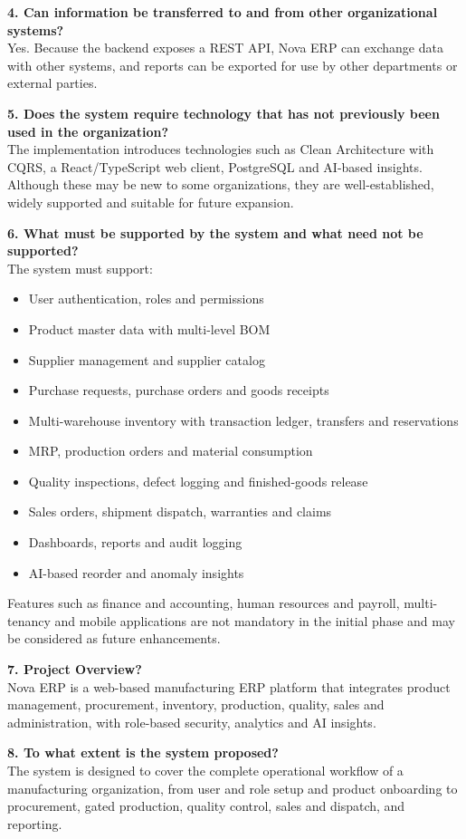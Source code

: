 \documentclass[12pt,a4paper]{report}
\begin{document}
\textbf{4. Can information be transferred to and from other organizational systems?}\\
Yes. Because the backend exposes a REST API, Nova ERP can exchange data with other systems, and reports can be exported for use by other departments or external parties.

\textbf{5. Does the system require technology that has not previously been used in the organization?}\\
The implementation introduces technologies such as Clean Architecture with CQRS, a React/TypeScript web client, PostgreSQL and AI-based insights. Although these may be new to some organizations, they are well-established, widely supported and suitable for future expansion.

\textbf{6. What must be supported by the system and what need not be supported?}\\
The system must support:
\begin{itemize}
\item User authentication, roles and permissions
\item Product master data with multi-level BOM
\item Supplier management and supplier catalog
\item Purchase requests, purchase orders and goods receipts
\item Multi-warehouse inventory with transaction ledger, transfers and reservations
\item MRP, production orders and material consumption
\item Quality inspections, defect logging and finished-goods release
\item Sales orders, shipment dispatch, warranties and claims
\item Dashboards, reports and audit logging
\item AI-based reorder and anomaly insights
\end{itemize}
Features such as finance and accounting, human resources and payroll, multi-tenancy and mobile applications are not mandatory in the initial phase and may be considered as future enhancements.

\textbf{7. Project Overview?}\\
Nova ERP is a web-based manufacturing ERP platform that integrates product management, procurement, inventory, production, quality, sales and administration, with role-based security, analytics and AI insights.

\textbf{8. To what extent is the system proposed?}\\
The system is designed to cover the complete operational workflow of a manufacturing organization, from user and role setup and product onboarding to procurement, gated production, quality control, sales and dispatch, and reporting.
\end{document}

